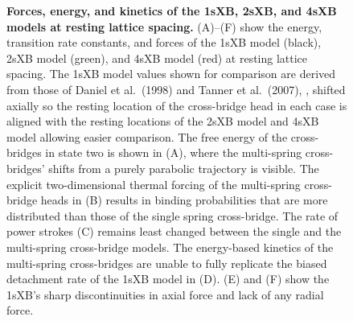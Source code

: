 \documentclass[10pt]{article}
\newcommand{\citep}[1]{\cite{#1}} %
\begin{document}
\begin{figure}[!ht]
    \begin{center}
    \end{center}
    \caption{ \textbf{Forces, energy, and kinetics of the 1sXB, 2sXB, and 4sXB models at resting lattice spacing.}
        (A)--(F) show the energy, transition rate constants, and forces of the 1sXB model (black), 2sXB model (green), and 4sXB model (red) at resting lattice spacing.  
        The 1sXB model values shown for comparison are derived from those of Daniel et al.~(1998) and Tanner et al.~(2007), \protect\citep{Daniel1998, Tanner2007}, shifted axially so the resting location of the cross-bridge head in each case is aligned with the resting locations of the 2sXB model and 4sXB model allowing easier comparison. 
        The free energy of the cross-bridges in state two is shown in (A), where the multi-spring cross-bridges' shifts from a purely parabolic trajectory is visible. 
        The explicit two-dimensional thermal forcing of the multi-spring cross-bridge heads in (B) results in binding probabilities that are more distributed than those of the single spring cross-bridge.
        The rate of power strokes (C) remains least changed between the single and the multi-spring cross-bridge models.  
        The energy-based kinetics of the multi-spring cross-bridges are unable to fully replicate the biased detachment rate of the 1sXB model in (D).
        (E) and (F) show the 1sXB's sharp discontinuities in axial force and lack of any radial force.
        }
    \label{fig_kinetics_cuts}
\end{figure}
\end{document}
